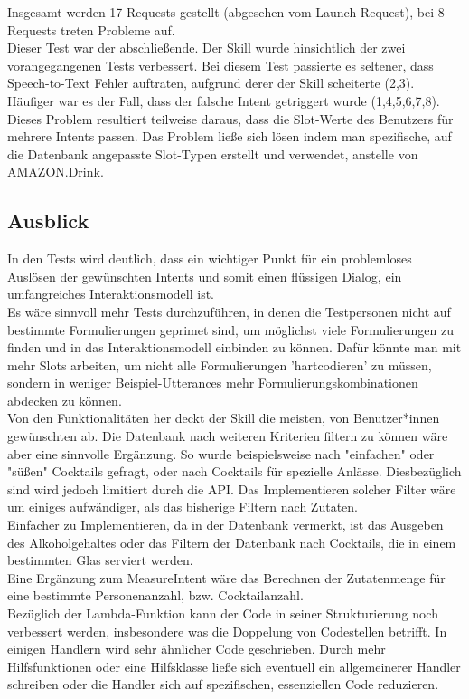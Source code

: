 \documentclass[12pt,letterpaper]{article}
\begin{document}
Insgesamt werden 17 Requests gestellt (abgesehen vom Launch Request), bei 8 Requests treten Probleme auf. \\ Dieser Test war der abschließende. Der Skill wurde hinsichtlich der zwei vorangegangenen Tests verbessert. Bei diesem Test passierte es seltener, dass Speech-to-Text Fehler auftraten, aufgrund derer der Skill scheiterte (2,3). Häufiger war es der Fall, dass der falsche Intent getriggert wurde (1,4,5,6,7,8). \\Dieses Problem resultiert teilweise daraus, dass die Slot-Werte des Benutzers für mehrere Intents passen. Das Problem ließe sich lösen indem man spezifische, auf die Datenbank angepasste Slot-Typen erstellt und verwendet, anstelle von AMAZON.Drink.

\subsection{Ausblick}
In den Tests wird deutlich, dass ein wichtiger Punkt für ein problemloses Auslösen der gewünschten Intents und somit einen flüssigen Dialog, ein umfangreiches Interaktionsmodell ist. \\Es wäre sinnvoll mehr Tests durchzuführen, in denen die Testpersonen nicht auf bestimmte Formulierungen geprimet sind, um möglichst viele Formulierungen zu finden und in das Interaktionsmodell einbinden zu können. Dafür könnte man mit mehr Slots arbeiten, um nicht alle Formulierungen 'hartcodieren' zu müssen, sondern in weniger Beispiel-Utterances mehr Formulierungskombinationen abdecken zu können. \\ Von den Funktionalitäten her deckt der Skill die meisten, von Benutzer*innen gewünschten ab. Die Datenbank nach weiteren Kriterien filtern zu können wäre aber eine sinnvolle Ergänzung. So wurde beispielsweise nach "einfachen" oder "süßen" Cocktails gefragt, oder nach Cocktails für spezielle Anlässe. Diesbezüglich sind wird jedoch limitiert durch die API. Das Implementieren solcher Filter wäre um einiges aufwändiger, als das bisherige Filtern nach Zutaten. \\Einfacher zu Implementieren, da in der Datenbank vermerkt, ist das Ausgeben des Alkoholgehaltes oder das Filtern der Datenbank nach Cocktails, die in einem bestimmten Glas serviert werden. \\ Eine Ergänzung zum MeasureIntent wäre das Berechnen der Zutatenmenge für eine bestimmte Personenanzahl, bzw. Cocktailanzahl.\\
Bezüglich der Lambda-Funktion kann der Code in seiner Strukturierung noch verbessert werden, insbesondere was die Doppelung von Codestellen betrifft. In einigen Handlern wird sehr ähnlicher Code geschrieben. Durch mehr Hilfsfunktionen oder eine Hilfsklasse ließe sich eventuell ein allgemeinerer Handler schreiben oder die Handler sich auf spezifischen, essenziellen Code reduzieren. 
\end{document}
